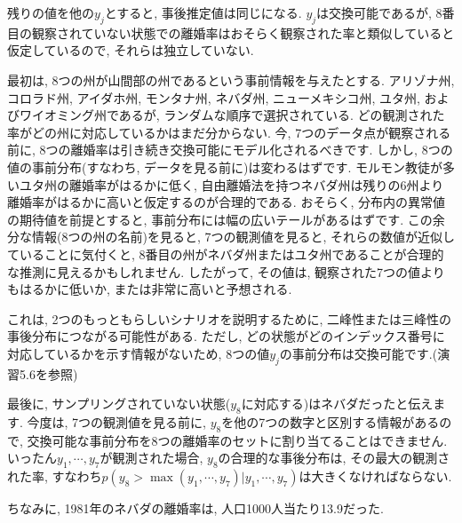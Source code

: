 \documentclass[10pt,dvipdfmx,a4]{beamer}
\begin{document}

\begin{frame}
残りの値を他の$y_j$とすると, 事後推定値は同じになる.
$y_j$は交換可能であるが, 8番目の観察されていない状態での離婚率はおそらく観察された率と類似していると仮定しているので, それらは独立していない.

最初は, 8つの州が山間部の州であるという事前情報を与えたとする.
アリゾナ州, コロラド州, アイダホ州, モンタナ州, ネバダ州, ニューメキシコ州, ユタ州, およびワイオミング州であるが, ランダムな順序で選択されている.
どの観測された率がどの州に対応しているかはまだ分からない.
今, 7つのデータ点が観察される前に, 8つの離婚率は引き続き交換可能にモデル化されるべきです.
しかし, 8つの値の事前分布(すなわち, データを見る前に)は変わるはずです.
モルモン教徒が多いユタ州の離婚率がはるかに低く, 自由離婚法を持つネバダ州は残りの6州より離婚率がはるかに高いと仮定するのが合理的である.
おそらく, 分布内の異常値の期待値を前提とすると, 事前分布には幅の広いテールがあるはずです.
この余分な情報(8つの州の名前)を見ると, 7つの観測値を見ると, それらの数値が近似していることに気付くと, 8番目の州がネバダ州またはユタ州であることが合理的な推測に見えるかもしれません.
したがって, その値は, 観察された7つの値よりもはるかに低いか, または非常に高いと予想される.
\end{frame}


\begin{frame}
これは, 2つのもっともらしいシナリオを説明するために, 二峰性または三峰性の事後分布につながる可能性がある.
ただし, どの状態がどのインデックス番号に対応しているかを示す情報がないため, 8つの値$y_j$の事前分布は交換可能です.(演習5.6を参照)

最後に, サンプリングされていない状態($y_8$に対応する)はネバダだったと伝えます.
今度は, 7つの観測値を見る前に, $y_8$を他の7つの数字と区別する情報があるので, 交換可能な事前分布を8つの離婚率のセットに割り当てることはできません.
いったん$y_1,\cdots,y_7$が観測された場合, $y_8$の合理的な事後分布は, その最大の観測された率, すなわち$p(y_8>\max(y_1,\cdots,y_7)| y_1,\cdots,y_7)$は大きくなければならない.

ちなみに, 1981年のネバダの離婚率は, 人口1000人当たり13.9だった.
\end{frame}

\end{document}
